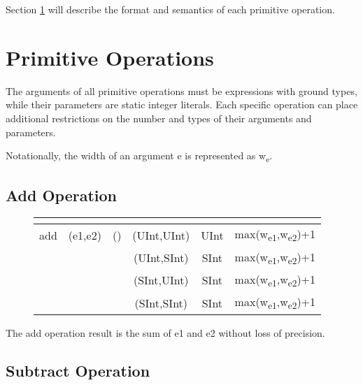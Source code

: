 \documentclass[12pt]{article}
\begin{document}
Section \ref{primitives} will describe the format and semantics of each primitive operation.

\section{Primitive Operations} \label{primitives}

\newcommand{\vv}[1]{{\ttfamily #1}}
\newcommand{\ts}[1]{\textsubscript{#1}}
\newcommand{\nf}[1]{\normalfont{\textbf{#1}}}
\newcommand{\opheader}{
 \hline
    \multicolumn{1}{|c|}{\nf{Name}} 
  & \multicolumn{1}{c|}{\nf{Arguments}}
  & \multicolumn{1}{c|}{\nf{Parameters}}
  & \multicolumn{1}{c|}{\nf{Arg Types}}
  & \multicolumn{1}{c|}{\nf{Result Type}}
  & \multicolumn{1}{c|}{\nf{Result Width}}\\
\hline  
}

The arguments of all primitive operations must be expressions with ground types, while their parameters are static integer literals. Each specific operation can place additional restrictions on the number and types of their arguments and parameters.

Notationally, the width of an argument \vv{e} is represented as \vv{w}\ts{e}.

\subsection{Add Operation}

\begin{figure}[H]
{ \fontsize{10pt}{1.10em}\selectfont
{\ttfamily
\begin{tabular}{ |c|c|c|c|c|c| }   
  \opheader 
add & (e1,e2) & () & (UInt,UInt) & UInt & max(w\ts{e1},w\ts{e2})+1\\
                 &&& (UInt,SInt) & SInt & max(w\ts{e1},w\ts{e2})+1\\
                 &&& (SInt,UInt) & SInt & max(w\ts{e1},w\ts{e2})+1\\
                 &&& (SInt,SInt) & SInt & max(w\ts{e1},w\ts{e2})+1\\
 \hline
\end{tabular}
}}
\end{figure}
The add operation result is the sum of \vv{e1} and \vv{e2} without loss of precision.

\subsection{Subtract Operation}
\end{document}
